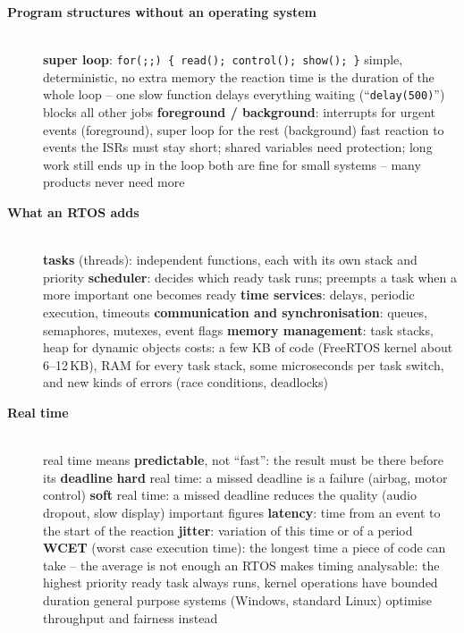 \begin{description}
\item[{\rot\bf Program structures without an operating system}]~\\[-\lblskip]
\bi
	\ite \textbf{super loop}: \texttt{for(;;) \{ read(); control(); show(); \}}
	\bi
		\ite simple, deterministic, no extra memory
		\ite the reaction time is the duration of the whole loop -- one slow function delays everything
		\ite waiting (``\texttt{delay(500)}'') blocks all other jobs
	\ei
	\ite \textbf{foreground / background}: interrupts for urgent events (foreground), super loop for the rest (background)
	\bi
		\ite fast reaction to events
		\ite the ISRs must stay short; shared variables need protection; long work still ends up in the loop
	\ei
	\ite both are fine for small systems -- many products never need more
\ei
\os{\newpage}

\item[{\rot\bf What an RTOS adds}]~\\[-\lblskip]
\bi
	\ite \textbf{tasks} (threads): independent functions, each with its own stack and priority
	\ite \textbf{scheduler}: decides which ready task runs; preempts a task when a more important one becomes ready
	\ite \textbf{time services}: delays, periodic execution, timeouts
	\ite \textbf{communication and synchronisation}: queues, semaphores, mutexes, event flags
	\ite \textbf{memory management}: task stacks, heap for dynamic objects
	\ite costs: a few KB of code (FreeRTOS kernel about 6--12\,KB), RAM for every task stack, some microseconds per task switch, and new kinds of errors (race conditions, deadlocks)
\ei
\os{\newpage}

\item[{\rot\bf Real time}]~\\[-\lblskip]
\bi
	\ite real time means \textbf{predictable}, not ``fast'': the result must be there before its \textbf{deadline}
	\bi
		\ite \textbf{hard} real time: a missed deadline is a failure (airbag, motor control)
		\ite \textbf{soft} real time: a missed deadline reduces the quality (audio dropout, slow display)
	\ei
	\ite important figures
	\bi
		\ite \textbf{latency}: time from an event to the start of the reaction
		\ite \textbf{jitter}: variation of this time or of a period
		\ite \textbf{WCET} (worst case execution time): the longest time a piece of code can take -- the average is not enough
	\ei
	\ite an RTOS makes timing analysable: the highest priority ready task always runs, kernel operations have bounded duration
	\ite general purpose systems (Windows, standard Linux) optimise throughput and fairness instead
\ei
\os{\newpage}
\end{description}

